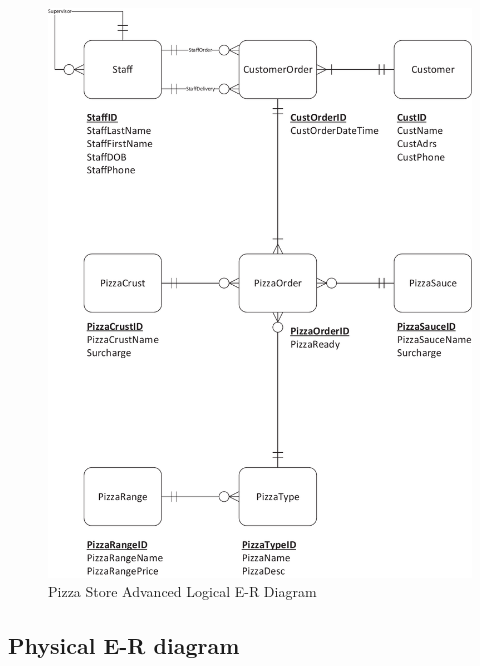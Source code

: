 \begin{figure}[H]
\centering
\caption{Pizza Store Advanced Logical E-R Diagram}
\includegraphics[scale=0.5]{./img/CSG1207_A1_PONCE_TASK_4_ADVLER_PIZZA.pdf}
\end{figure}

\subsection{Physical E-R diagram}

